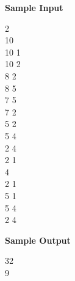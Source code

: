 \begin{flushleft}
{\color{red} \textbf{Sample Input}}
\end{flushleft}
\begin{flushleft}
2\\
10\\
10 1\\
10 2\\
8 2\\
8 5\\
7 5\\
7 2\\
5 2\\
5 4\\
2 4\\
2 1\\
4\\
2 1\\
5 1\\
5 4\\
2 4\\
\end{flushleft}

\begin{flushleft}
{\color{red} \textbf{Sample Output}}
\end{flushleft}
\begin{flushleft}
32\\
9\\
\end{flushleft}

\newpage